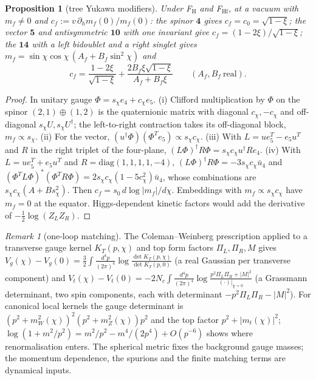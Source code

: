 \documentclass[aps,pra,onecolumn,superscriptaddress,nofootinbib,10pt]{revtex4-2}
\newtheorem{proposition}[theorem]{Proposition}
\theoremstyle{definition}
\theoremstyle{remark}
\newtheorem{remark}[theorem]{Remark}
\begin{document}
\begin{proposition}[tree Yukawa modifiers]\label{prop:hbyuk}
Under F$_{\mathrm H}$ and F$_{\mathrm{Hf}}$, at a vacuum with $m_f\ne0$ and $c_f:=v\,\partial_hm_f(0)/m_f(0)$: the spinor $\mathbf4$ gives $c_f=c_0=\sqrt{1-\xi}$; the
vector $\mathbf5$ and antisymmetric $\mathbf{10}$ with one invariant give $c_f=(1-2\xi)/\sqrt{1-\xi}$; the $\mathbf{14}$ with a left bidoublet and a
right singlet gives $m_f=\sin\chi\cos\chi\,(A_f+B_f\sin^2\chi)$ and
\begin{equation}\label{eq:hbyuk14}
c_f=\frac{1-2\xi}{\sqrt{1-\xi}}+\frac{2B_f\xi\sqrt{1-\xi}}{A_f+B_f\xi}\qquad(A_f,B_f\ \text{real}).
\end{equation}
\end{proposition}
\begin{proof}
In unitary gauge $\Phi=s_\chi e_4+c_\chi e_5$.  (i) Clifford multiplication by $\Phi$ on the spinor $(2,1)\oplus(1,2)$ is the
quaternionic matrix with diagonal $c_\chi,-c_\chi$ and off-diagonal $s_\chi U,s_\chi U^\dagger$; the left-to-right contraction takes
its off-diagonal block, $m_f\propto s_\chi$.  (ii) For the vector, $(u^\dagger\Phi)(\Phi^Te_5)\propto s_\chi c_\chi$.  (iii) With $L=ue_5^T-e_5u^T$ and $R$
in the right triplet of the four-plane, $(L\Phi)^\dagger R\Phi=s_\chi c_\chi u^\dagger Re_4$.  (iv) With $L=ue_5^T+e_5u^T$ and $R=\mathrm{diag}(1,1,1,1,-4)$,
$(L\Phi)^\dagger R\Phi=-3s_\chi c_\chi\bar u_4$ and $(\Phi^TL\Phi)^*(\Phi^TR\Phi)=2s_\chi c_\chi(1-5c_\chi^2)\bar u_4$, whose combinations are $s_\chi c_\chi(A+Bs_\chi^2)$.
Then $c_f=s_0\,d\log\lvert m_f\rvert/d\chi$.  Embeddings with $m_f\propto s_\chi c_\chi$ have $m_f=0$ at the equator.  Higgs-dependent
kinetic factors would add the derivative of $-\tfrac12\log(Z_LZ_R)$.
\end{proof}

\begin{remark}[one-loop matching]\label{rem:hbloops}
The Coleman--Weinberg prescription \cite{n7:CW,n7:ACP,n7:PW} applied to a transverse gauge kernel $K_T(p,\chi)$ and top
form factors $\Pi_L,\Pi_R,M$ gives $V_g(\chi)-V_g(0)=\tfrac32\int\frac{d^4p}{(2\pi)^4}\log\frac{\det K_T(p,\chi)}{\det K_T(p,0)}$ (a real Gaussian per transverse
component) and $V_t(\chi)-V_t(0)=-2N_c\int\frac{d^4p}{(2\pi)^4}\log\frac{p^2\Pi_L\Pi_R+\lvert M\rvert^2}{(\cdot)|_{\chi=0}}$ (a Grassmann determinant, two spin components,
each with determinant $-p^2\Pi_L\Pi_R-\lvert M\rvert^2$).  For canonical local kernels the gauge determinant is
$(p^2+m_W^2(\chi))^2(p^2+m_Z^2(\chi))p^2$ and the top factor $p^2+\lvert m_t(\chi)\rvert^2$; $\log(1+m^2/p^2)=m^2/p^2-m^4/(2p^4)+O(p^{-6})$ shows where
renormalisation enters.  The spherical metric fixes the background gauge masses; the momentum
dependence, the spurions and the finite matching terms are dynamical inputs.
\end{remark}
\end{document}
